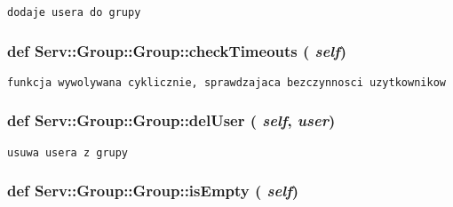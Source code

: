 \footnotesize\begin{verbatim}dodaje usera do grupy

\end{verbatim}
\normalsize
 \hypertarget{class_serv_1_1_group_1_1_group_ff52dadf0f67e54340f9602cc3a6fbba}{
\subsubsection[{checkTimeouts}]{\setlength{\rightskip}{0pt plus 5cm}def Serv::Group::Group::checkTimeouts ( {\em self})}}
\label{class_serv_1_1_group_1_1_group_ff52dadf0f67e54340f9602cc3a6fbba}




\footnotesize\begin{verbatim}funkcja wywolywana cyklicznie, sprawdzajaca bezczynnosci uzytkownikow

\end{verbatim}
\normalsize
 \hypertarget{class_serv_1_1_group_1_1_group_48768b6b5440e56d42d632085b2a8aef}{
\subsubsection[{delUser}]{\setlength{\rightskip}{0pt plus 5cm}def Serv::Group::Group::delUser ( {\em self}, \/   {\em user})}}
\label{class_serv_1_1_group_1_1_group_48768b6b5440e56d42d632085b2a8aef}




\footnotesize\begin{verbatim}usuwa usera z grupy

\end{verbatim}
\normalsize
 \hypertarget{class_serv_1_1_group_1_1_group_51e7ce8393ee398260d4e12e904da5ab}{
\subsubsection[{isEmpty}]{\setlength{\rightskip}{0pt plus 5cm}def Serv::Group::Group::isEmpty ( {\em self})}}
\label{class_serv_1_1_group_1_1_group_51e7ce8393ee398260d4e12e904da5ab}




